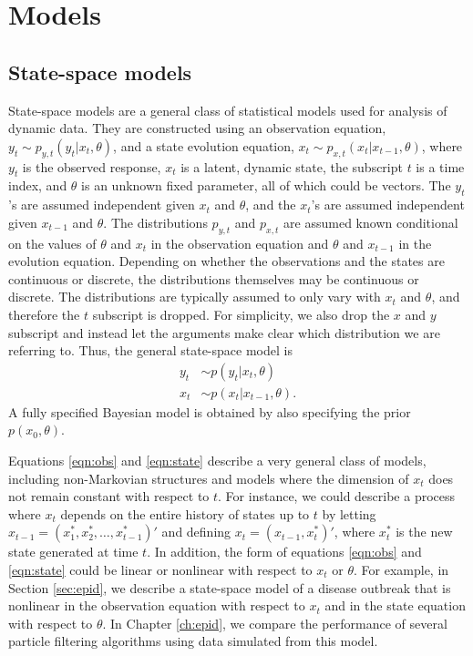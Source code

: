 \chapter{Models \label{ch:models}}

\section{State-space models \label{sec:ss}}

State-space models are a general class of statistical models used for analysis of dynamic data.  They are constructed using an observation equation, $y_t \sim p_{y,t}(y_t|x_t,\theta)$, and a state evolution equation, $x_t \sim p_{x,t}(x_t|x_{t-1},\theta)$, where $y_t$ is the observed response, $x_t$ is a latent, dynamic state, the subscript $t$ is a time index, and $\theta$ is an unknown fixed parameter, all of which could be vectors. The $y_t$'s are assumed independent given $x_t$ and $\theta$, and the $x_t$'s are assumed independent given $x_{t-1}$ and $\theta$. The distributions $p_{y,t}$ and $p_{x,t}$ are assumed known conditional on the values of $\theta$ and $x_t$ in the observation equation and $\theta$ and $x_{t-1}$ in the evolution equation. Depending on whether the observations and the states are continuous or discrete, the distributions themselves may be continuous or discrete. The distributions are typically assumed to only vary with $x_t$ and $\theta$, and therefore the $t$ subscript is dropped. For simplicity, we also drop the $x$ and $y$ subscript and instead let the arguments make clear which distribution we are referring to. Thus, the general state-space model is
\begin{align}
y_t &\sim p(y_t|x_t,\theta) \label{eqn:obs} \\
x_t &\sim p(x_t|x_{t-1},\theta). \label{eqn:state}
\end{align}
A fully specified Bayesian model is obtained by also specifying the prior $p(x_0,\theta)$.

Equations \eqref{eqn:obs} and \eqref{eqn:state} describe a very general class of models, including non-Markovian structures and models where the dimension of $x_t$ does not remain constant with respect to $t$. For instance, we could describe a process where $x_t$ depends on the entire history of states up to $t$ by letting $x_{t-1} = (x^*_1, x^*_2, \ldots, x^*_{t-1})'$ and defining $x_t = (x_{t-1}, x^*_t)'$, where $x^*_t$ is the new state generated at time $t$. In addition, the form of equations \eqref{eqn:obs} and \eqref{eqn:state} could be linear or nonlinear with respect to $x_t$ or $\theta$. For example, in Section \ref{sec:epid}, we describe a state-space model of a disease outbreak that is nonlinear in the observation equation with respect to $x_t$ and in the state equation with respect to $\theta$. In Chapter \ref{ch:epid}, we compare the performance of several particle filtering algorithms using data simulated from this model.

